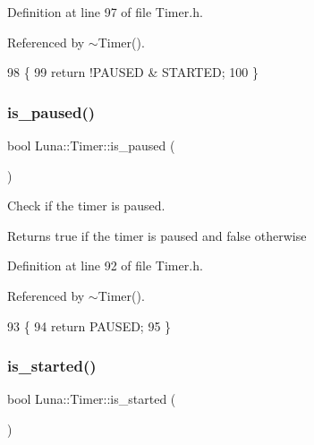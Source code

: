 Definition at line 97 of file Timer.\+h.



Referenced by $\sim$\+Timer().


\begin{DoxyCode}
98     \{
99         \textcolor{keywordflow}{return} !PAUSED & STARTED;
100     \}
\end{DoxyCode}
\mbox{\label{classLuna_1_1Timer_a006199b985e14e421d7dc1ef5d6e08a8}} 
\subsubsection{\texorpdfstring{is\+\_\+paused()}{is\_paused()}}
{\footnotesize\ttfamily bool Luna\+::\+Timer\+::is\+\_\+paused (\begin{DoxyParamCaption}{ }\end{DoxyParamCaption})\hspace{0.3cm}{\ttfamily [inline]}}



Check if the timer is paused. 

\begin{DoxyReturn}{Returns}
true if the timer is paused and false otherwise 
\end{DoxyReturn}


Definition at line 92 of file Timer.\+h.



Referenced by $\sim$\+Timer().


\begin{DoxyCode}
93     \{
94         \textcolor{keywordflow}{return} PAUSED;
95     \}
\end{DoxyCode}
\mbox{\label{classLuna_1_1Timer_acd735003d27555b69bc3c54e8cd4a301}} 
\subsubsection{\texorpdfstring{is\+\_\+started()}{is\_started()}}
{\footnotesize\ttfamily bool Luna\+::\+Timer\+::is\+\_\+started (\begin{DoxyParamCaption}{ }\end{DoxyParamCaption})\hspace{0.3cm}{\ttfamily [inline]}}



